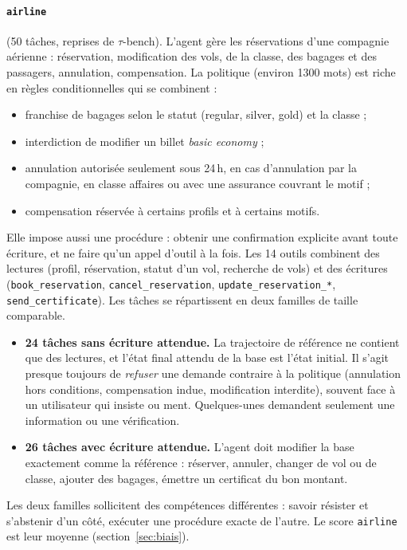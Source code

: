\paragraph{\texttt{airline}} (50 tâches, reprises de $\tau$-bench). L'agent gère les réservations d'une compagnie aérienne : réservation, modification des vols, de la classe, des bagages et des passagers, annulation, compensation. La politique (environ 1300 mots) est riche en règles conditionnelles qui se combinent :
\begin{itemize}[nosep]
  \item franchise de bagages selon le statut (regular, silver, gold) et la classe ;
  \item interdiction de modifier un billet \emph{basic economy} ;
  \item annulation autorisée seulement sous 24\,h, en cas d'annulation par la compagnie, en classe affaires ou avec une assurance couvrant le motif ;
  \item compensation réservée à certains profils et à certains motifs.
\end{itemize}
Elle impose aussi une procédure : obtenir une confirmation explicite avant toute écriture, et ne faire qu'un appel d'outil à la fois. Les 14 outils combinent des lectures (profil, réservation, statut d'un vol, recherche de vols) et des écritures (\texttt{book\_reservation}, \texttt{cancel\_reservation}, \texttt{update\_reservation\_*}, \texttt{send\_certificate}). Les tâches se répartissent en deux familles de taille comparable.
\begin{itemize}[nosep]
  \item \textbf{24 tâches sans écriture attendue.} La trajectoire de référence ne contient que des lectures, et l'état final attendu de la base est l'état initial. Il s'agit presque toujours de \emph{refuser} une demande contraire à la politique (annulation hors conditions, compensation indue, modification interdite), souvent face à un utilisateur qui insiste ou ment. Quelques-unes demandent seulement une information ou une vérification.
  \item \textbf{26 tâches avec écriture attendue.} L'agent doit modifier la base exactement comme la référence : réserver, annuler, changer de vol ou de classe, ajouter des bagages, émettre un certificat du bon montant.
\end{itemize}
Les deux familles sollicitent des compétences différentes : savoir résister et s'abstenir d'un côté, exécuter une procédure exacte de l'autre. Le score \texttt{airline} est leur moyenne (section~\ref{sec:biais}).

